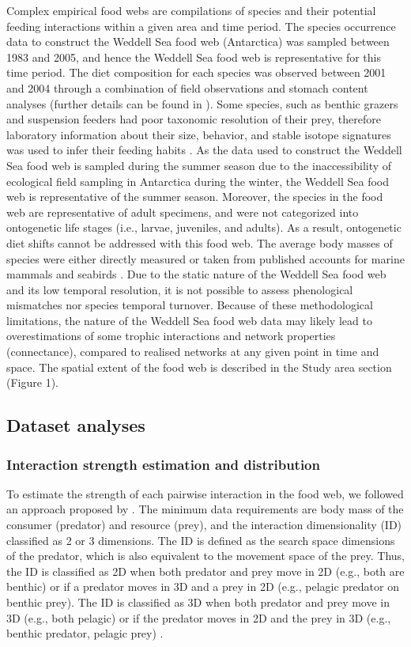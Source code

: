 \documentclass[gc, manuscript]{copernicus}
\begin{document}
Complex empirical food webs are compilations of species and their
potential feeding interactions within a given area and time period. The
species occurrence data to construct the Weddell Sea food web
(Antarctica) was sampled between 1983 and 2005, and hence the Weddell
Sea food web is representative for this time period. The diet
composition for each species was observed between 2001 and 2004 through
a combination of field observations and stomach content analyses
(further details can be found in \citet{Jacob2005}). Some species, such
as benthic grazers and suspension feeders had poor taxonomic resolution
of their prey, therefore laboratory information about their size,
behavior, and stable isotope signatures was used to infer their feeding
habits \citep{Jacob2011}. As the data used to construct the Weddell Sea
food web is sampled during the summer season due to the inaccessibility
of ecological field sampling in Antarctica during the winter, the
Weddell Sea food web is representative of the summer season. Moreover,
the species in the food web are representative of adult specimens, and
were not categorized into ontogenetic life stages (i.e., larvae,
juveniles, and adults). As a result, ontogenetic diet shifts cannot be
addressed with this food web. The average body masses of species were
either directly measured \citep{Jacob2005} or taken from published
accounts for marine mammals and seabirds \citep{Brose2006a}. Due to the
static nature of the Weddell Sea food web and its low temporal
resolution, it is not possible to assess phenological mismatches nor
species temporal turnover. Because of these methodological limitations,
the nature of the Weddell Sea food web data may likely lead to
overestimations of some trophic interactions and network properties
(connectance), compared to realised networks at any given point in time
and space. The spatial extent of the food web is described in the Study
area section (Figure 1).

\subsection{Dataset analyses}

\subsubsection{Interaction strength estimation and distribution}

To estimate the strength of each pairwise interaction in the food web,
we followed an approach proposed by \citet{Pawar2012}. The minimum data
requirements are body mass of the consumer (predator) and resource
(prey), and the interaction dimensionality (ID) classified as 2 or 3
dimensions. The ID is defined as the search space dimensions of the
predator, which is also equivalent to the movement space of the prey.
Thus, the ID is classified as 2D when both predator and prey move in 2D
(e.g., both are benthic) or if a predator moves in 3D and a prey in 2D
(e.g., pelagic predator on benthic prey). The ID is classified as 3D
when both predator and prey move in 3D (e.g., both pelagic) or if the
predator moves in 2D and the prey in 3D (e.g., benthic predator, pelagic
prey) \citep{Pawar2012}.
\end{document}
